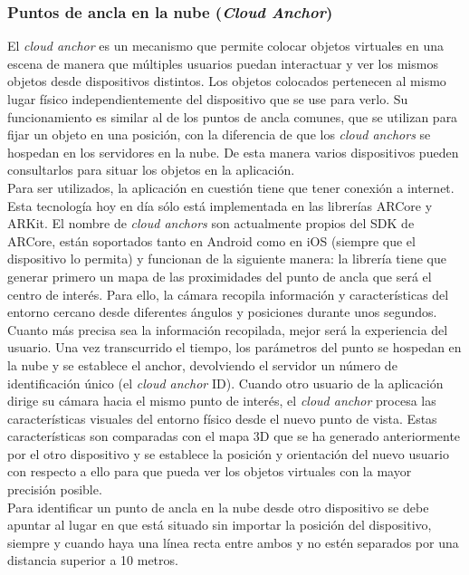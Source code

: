 \subsubsection{Puntos de ancla en la nube (\textit{Cloud Anchor})}\label{cloudAnchorsSection}
El \textit{cloud anchor} es un mecanismo que permite colocar objetos virtuales en una escena de manera que múltiples usuarios puedan interactuar y ver los mismos objetos desde dispositivos distintos. Los objetos colocados pertenecen al mismo lugar físico independientemente del dispositivo que se use para verlo. Su funcionamiento es similar al de los puntos de ancla comunes, que se utilizan para fijar un objeto en una posición, con la diferencia de que los \textit{cloud anchors} se hospedan en los servidores en la nube. De esta manera varios dispositivos pueden consultarlos para situar los objetos en la aplicación.\\

Para ser utilizados, la aplicación en cuestión tiene que tener conexión a internet. Esta tecnología hoy en día sólo está implementada en las librerías ARCore y ARKit. El nombre de \textit{cloud anchors} son actualmente propios del SDK de ARCore, están soportados tanto en Android como en iOS (siempre que el dispositivo lo permita) y funcionan de la siguiente manera: la librería tiene que generar primero un mapa de las proximidades del punto de ancla que será el centro de interés. Para ello, la cámara recopila información y características del entorno cercano desde diferentes ángulos y posiciones durante unos segundos. Cuanto más precisa sea la información recopilada, mejor será la experiencia del usuario. Una vez transcurrido el tiempo, los parámetros del punto se hospedan en la nube y se establece el anchor, devolviendo el servidor un número de identificación único (el \textit{cloud anchor} ID). Cuando otro usuario de la aplicación dirige su cámara hacia el mismo punto de interés, el \textit{cloud anchor} procesa las características visuales del entorno físico desde el nuevo punto de vista. Estas características son comparadas con el mapa 3D que se ha generado anteriormente por el otro dispositivo y se establece la posición y orientación del nuevo usuario con respecto a ello para que pueda ver los objetos virtuales con la mayor precisión posible.\\

Para identificar un punto de ancla en la nube desde otro dispositivo se debe apuntar al lugar en que está situado sin importar la posición del dispositivo, siempre y cuando haya una línea recta entre ambos y no estén separados por una distancia superior a 10 metros.\\

